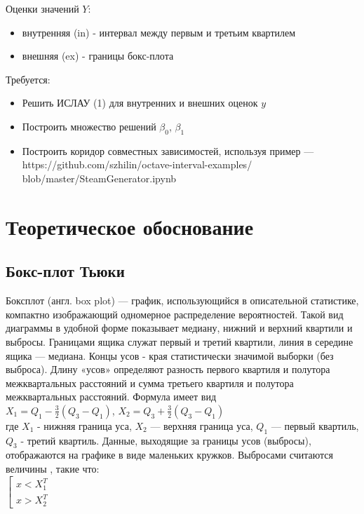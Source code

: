 \documentclass[a4paper, 12pt]{article}
\begin{document}
Оценки значений $Y$:
\begin{itemize}
    \item внутренняя (in) - интервал между первым и третьим квартилем
    \item внешняя (ex) -  границы бокс-плота
\end{itemize}
\vspace{5mm}
Требуется:
\begin{itemize}
    \item Решить ИСЛАУ (1) для внутренних и внешних оценок $y$
    \item Построить множество решений $\beta _0$, $\beta _1$
    \item Построить коридор совместных зависимостей, используя пример — \\https://github.com/szhilin/octave-interval-examples/
blob/master/SteamGenerator.ipynb
\end{itemize}


\section{Теоретическое обоснование}

\subsection{Бокс-плот Тьюки}
Боксплот (англ. box plot) — график, использующийся в описательной статистике, компактно изображающий одномерное распределение вероятностей. Такой вид диаграммы в удобной форме показывает медиану, нижний и верхний квартили и выбросы. Границами ящика служат первый и третий квартили, линия в середине ящика — медиана. Концы усов - края статистически значимой выборки (без выброса). Длину «усов» определяют разность первого квартиля и полутора межквартальных расстояний и сумма третьего квартиля и полутора межквартальных расстояний. Формула имеет вид\\
$X_1 = Q_1 - \frac{3}{2}(Q_3 - Q_1)$, $X_2 = Q_3 + \frac{3}{2}(Q_3 - Q_1)$
\\где $X_1$ - нижняя граница уса, $X_2$ — верхняя граница уса, $Q_1$ — первый квартиль, $Q_3$ - третий квартиль. Данные, выходящие за границы усов (выбросы), отображаются на графике в виде маленьких кружков. Выбросами считаются величины , такие что:\\
$\left[ \begin{gathered}
x < X_1^T\\
x > X_2^T
\end{gathered} \right.$
\end{document}
